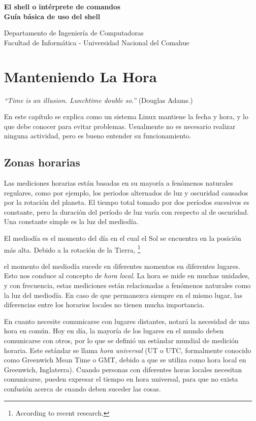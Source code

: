 \documentclass[12pt]{article}
\def\maketitle{

 \makeatletter
 {\color{bl} \centering \huge \sc \textbf{
 El shell o intérprete de comandos \\ 
\large \vspace*{-8pt} \color{black} Guía básica de uso del shell
 \vspace*{8pt} }\par}
 \makeatother


 \makeatletter
 {\centering \small 
 	Departamento de Ingeniería de Computadoras \\
 	Facultad de Informática - Universidad Nacional del Comahue \\
 	\vspace{20pt} }
 \makeatother

}
\begin{document}
\thispagestyle{empty}
\maketitle
\setlength{\parindent}{0pt}

\section{ Manteniendo La Hora}

\textit{``Time is an illusion. Lunchtime double so.''} (Douglas Adams.)


En este capítulo se explica como un sistema Linux mantiene la fecha y hora,
y lo que debe conocer para evitar problemas.
Usualmente no es necesario realizar
ninguna actividad, pero es bueno entender su funcionamiento.


\subsection{
Zonas horarias}

Las mediciones horarias están basadas en su mayoría a fenómenos naturales regulares,
como por ejemplo, los periodos alternados de luz y oscuridad
causados por la rotación del planeta. El tiempo total tomado por dos períodos
sucesivos es constante, pero la duración del período de luz varía
con respecto al de oscuridad. Una constante simple es la luz del mediodía.



El mediodía es el momento del día en el cual el Sol se encuentra en la posición más alta. 
Debido a la rotación de la Tierra,
		\footnote{According to
		recent research.}

 el momento del mediodía sucede en diferentes 
momentos en diferentes lugares. Esto nos conduce al concepto de \textit{hora local}.
La hora se mide en muchas unidades, y con frecuencia, estas
mediciones están relacionadas a fenómenos naturales como la luz del mediodía.
En caso de que permanezca siempre en el mismo lugar, las diferencias entre los
horarios locales no tienen mucha importancia.



En cuanto necesite comunicarse con lugares distantes, notará la necesidad de una
hora en común. Hoy en día, la mayoría de los lugares en el mundo deben
comunicarse con otros, por lo que se definió un estándar mundial de medición
horaria. Este estándar se llama \textit{hora universal} (UT o UTC, formalmente
conocido como Greenwich Mean Time o GMT, debido a que se utiliza como hora
local en Greenwich, Inglaterra). Cuando personas con diferentes horas locales
necesitan comunicarse, pueden expresar el tiempo en hora universal,
para que no exista confusión acerca de cuando deben suceder las cosas.
\end{document}
